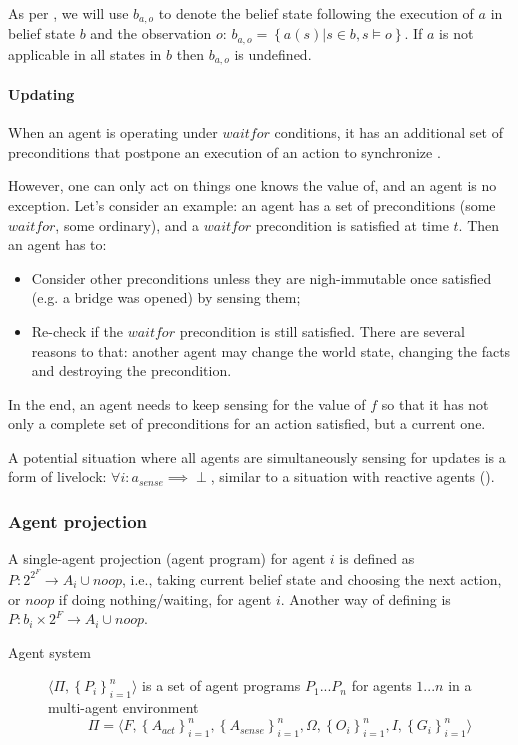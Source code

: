 \documentclass[fleqn,10pt]{olplainarticle}
\begin{document}
As per \cite{karpas_automated_2017}, we will use $b_{a,o}$ to denote the belief state following the execution of $a$ in belief state $b$ and the observation $o$: $b_{a,o} = \left\{a(s)|s \in b, s \models o \right\}$. If $a$ is not applicable in all states in $b$ then $b_{a,o}$ is undefined.

\paragraph{Updating}
When an agent is operating under $waitfor$ conditions, it has an additional set of preconditions that postpone an execution of an action to synchronize \cite{karpas_automated_2017}.

However, one can only act on things one knows the value of, and an agent is no exception.
Let's consider an example: an agent has a set of preconditions (some $waitfor$, some ordinary), and a $waitfor$ precondition is satisfied at time $t$. Then an agent has to:
\begin{itemize}
    \item Consider other preconditions unless they are nigh-immutable once satisfied (e.g. a bridge was opened) by sensing them;
    \item Re-check if the $waitfor$ precondition is still satisfied. There are several reasons to that: another agent may change the world state, changing the facts and destroying the precondition.
\end{itemize}

In the end, an agent needs to keep sensing for the value of $f$ so that it has not only a complete set of preconditions for an action satisfied, but a current one. 

A potential situation where all agents are simultaneously sensing for updates is a form of livelock: $\forall i: a_{sense} \implies \perp$, similar to a situation with reactive agents (\cite{tuisov_automated_2020}).
\subsubsection{Agent projection} \label{agent-projection}
A single-agent projection (agent program) for agent $i$ is defined as $P: 2^{2^F} \rightarrow A_i \cup {noop}$, i.e., taking current belief state and choosing the next action, or $noop$ if doing nothing/waiting, for agent $i$. Another way of defining is $P: b_i \times 2^F \rightarrow A_i \cup noop$.

\begin{description}
\item [Agent system] $\langle \Pi, \left\{P_i\right\}_{i=1}^n \rangle$ is a set of agent programs $P_1...P_n$ for agents $1... n$ in a multi-agent environment 
\begin{equation}
\Pi = \langle F, \left\{ A_{act} \right\}_{i=1}^n, \left\{ A_{sense} \right\}_{i=1}^n, \Omega, \left\{ O_i \right\}_{i=1}^n, I, \left\{ G_i \right\}_{i=1}^n \rangle
\end{equation}
\end{description}
\end{document}
